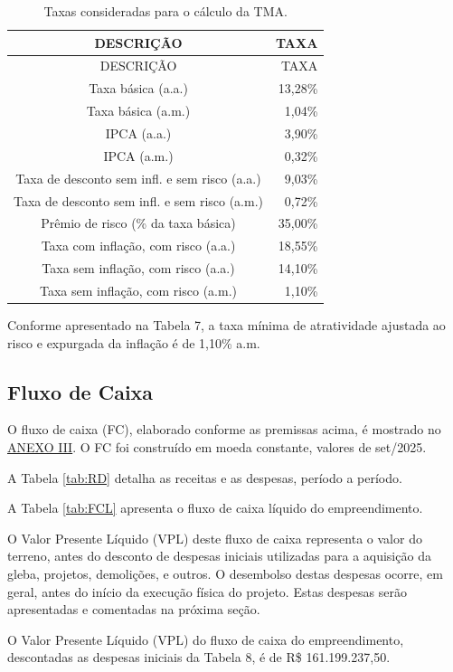 \documentclass[
  10pt,
  a4paper]{article}
\begin{document}
\begin{longtable}[]{@{}cr@{}}
\caption{Taxas consideradas para o cálculo da TMA.}\tabularnewline
\toprule\noalign{}
DESCRIÇÃO & TAXA \\
\midrule\noalign{}
\endfirsthead
\toprule\noalign{}
DESCRIÇÃO & TAXA \\
\midrule\noalign{}
\endhead
\bottomrule\noalign{}
\endlastfoot
Taxa básica (a.a.) & 13,28\% \\
Taxa básica (a.m.) & 1,04\% \\
IPCA (a.a.) & 3,90\% \\
IPCA (a.m.) & 0,32\% \\
Taxa de desconto sem infl. e sem risco (a.a.) & 9,03\% \\
Taxa de desconto sem infl. e sem risco (a.m.) & 0,72\% \\
Prêmio de risco (\% da taxa básica) & 35,00\% \\
Taxa com inflação, com risco (a.a.) & 18,55\% \\
Taxa sem inflação, com risco (a.a.) & 14,10\% \\
Taxa sem inflação, com risco (a.m.) & 1,10\% \\
\end{longtable}

Conforme apresentado na Tabela 7, a taxa mínima de atratividade ajustada
ao risco e expurgada da inflação é de 1,10\% a.m.

\subsection{Fluxo de Caixa}\label{fluxo-de-caixa}

O fluxo de caixa (FC), elaborado conforme as premissas acima, é mostrado
no \hyperref[anexo-iii]{ANEXO III}. O FC foi construído em moeda
constante, valores de set/2025.

A Tabela \ref{tab:RD} detalha as receitas e as despesas, período a
período.

A Tabela \ref{tab:FCL} apresenta o fluxo de caixa líquido do
empreendimento.

O Valor Presente Líquido (VPL) deste fluxo de caixa representa o valor
do terreno, antes do desconto de despesas iniciais utilizadas para a
aquisição da gleba, projetos, demolições, e outros. O desembolso destas
despesas ocorre, em geral, antes do início da execução física do
projeto. Estas despesas serão apresentadas e comentadas na próxima
seção.

O Valor Presente Líquido (VPL) do fluxo de caixa do empreendimento,
descontadas as despesas iniciais da Tabela 8, é de R\$ 161.199.237,50.
\end{document}
